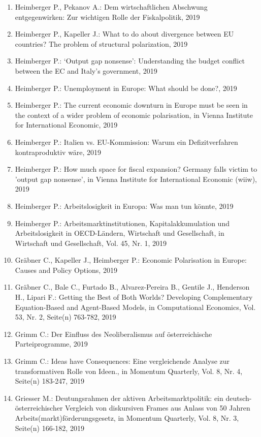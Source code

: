 \begin{enumerate}
	 \item Heimberger P., Pekanov A.: Dem wirtschaftlichen Abschwung entgegenwirken: Zur wichtigen Rolle der Fiskalpolitik, 2019
	 \item Heimberger P., Kapeller J.: What to do about divergence between EU countries? The problem of structural polarization, 2019
	 \item Heimberger P.: ‘Output gap nonsense': Understanding the budget conflict between the EC and Italy’s government, 2019
	 \item Heimberger P.: Unemployment in Europe: What should be done?, 2019
	 \item Heimberger P.: The current economic downturn in Europe must be seen in the context of a wider problem of economic polarisation, in Vienna Institute for International Economic, 2019
	 \item Heimberger P.: Italien vs. EU-Kommission: Warum ein Defizitverfahren kontraproduktiv wäre, 2019
	 \item Heimberger P.: How much space for fiscal expansion? Germany falls victim to 'output gap nonsense’, in Vienna Institute for International Economic (wiiw), 2019
	 \item Heimberger P.: Arbeitslosigkeit in Europa: Was man tun könnte, 2019
	 \item Heimberger P.: Arbeitsmarktinstitutionen, Kapitalakkumulation und Arbeitslosigkeit in OECD-Ländern, Wirtschaft und Gesellschaft, in Wirtschaft und Gesellschaft, Vol. 45, Nr. 1, 2019
	 \item Gräbner C., Kapeller J., Heimberger P.: Economic Polarisation in Europe: Causes and Policy Options, 2019
	 \item Gräbner C., Bale C., Furtado B., Alvarez-Pereira B., Gentile J., Henderson H., Lipari F.: Getting the Best of Both Worlds? Developing Complementary Equation-Based and Agent-Based Models, in Computational Economics, Vol. 53, Nr. 2, Seite(n) 763-782, 2019
	 \item Grimm C.: Der Einfluss des Neoliberalismus auf österreichische Parteiprogramme, 2019
	 \item Grimm C.: Ideas have Consequences: Eine vergleichende Analyse zur transformativen Rolle von Ideen., in Momentum Quarterly, Vol. 8, Nr. 4, Seite(n) 183-247, 2019
	 \item Griesser M.: Deutungsrahmen der aktiven Arbeitsmarktpolitik: ein deutsch-österreichischer Vergleich von diskursiven Frames aus Anlass von 50 Jahren Arbeits(markt)förderungsgesetz, in Momentum Quarterly, Vol. 8, Nr. 3, Seite(n) 166-182, 2019

\end{enumerate}
